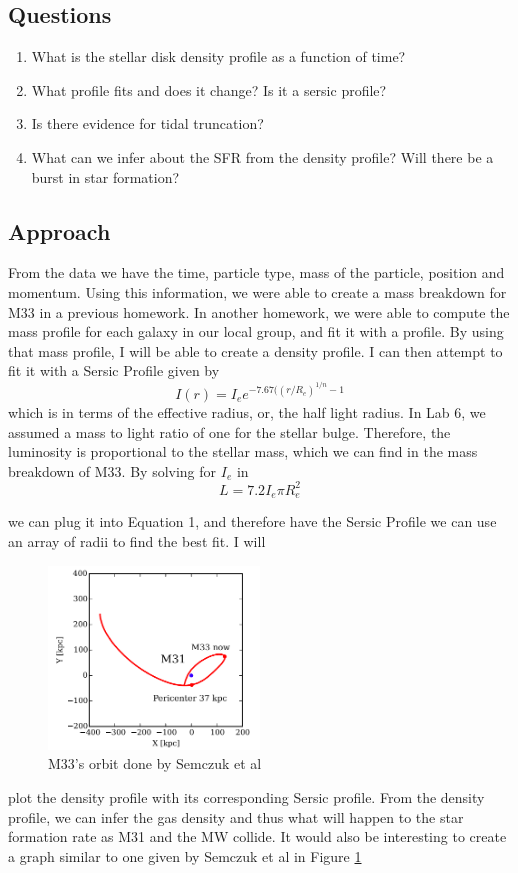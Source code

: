 \documentclass[10pt]{extarticle}
\begin{document}
\subsection{Questions}
\begin{enumerate}
  \item What is the stellar disk density profile as a function of time?
  \item What profile fits and does it change? Is it a sersic profile?
  \item Is there evidence for tidal truncation?
  \item What can we infer about the SFR from the density profile? Will there be a burst in star formation?
\end{enumerate}

\subsection{Approach}
From the data we have the time, particle type, mass of the particle, position and momentum. Using this information, we were able to create a mass breakdown for M33 in a previous homework. In another homework, we were able to compute the mass profile for each galaxy in our local group, and fit it with a profile. By using that mass profile, I will be able to create a density profile. I can then attempt to fit it with a Sersic Profile given by \begin{equation}
    I(r) = I_e e^{-7.67((r/R_e)^{1/n}-1}
\end{equation}
which is in terms of the effective radius, or, the half light radius. In Lab 6, we assumed a mass to light ratio of one for the stellar bulge. Therefore, the luminosity is proportional to the stellar mass, which we can find in the mass breakdown of M33. By solving for $I_e$ in \begin{equation}
    L = 7.2I_e \pi R_e^2
\end{equation}

we can plug it into Equation 1, and therefore have the Sersic Profile we can use an array of radii to find the best fit. I will \begin{figure}
    \centering
    \includegraphics[width=0.5\textwidth]{Orbit.png}
    \caption{M33's orbit done by Semczuk et al}
    \label{fig:orbit}
\end{figure}plot the density profile with its corresponding Sersic profile. From the density profile, we can infer the gas density and thus what will happen to the star formation rate as M31 and the MW collide. It would also be interesting to create a graph similar to one given by Semczuk et al in Figure \ref{fig:orbit}
\end{document}
